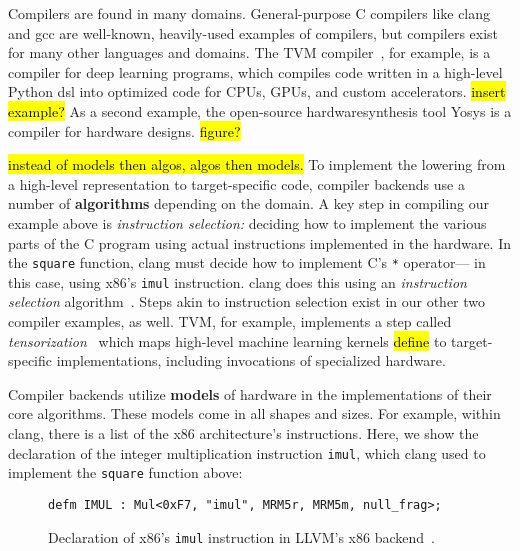 Compilers are found in many domains.
General-purpose C compilers like
  clang and gcc
  are well-known, heavily-used examples
  of compilers,
  but compilers exist for many other languages
  and domains.
The TVM compiler~\cite{tvm,chen2018tvm},
  for example,
  is a compiler for deep learning
  programs,
  which compiles code written in a
  high-level
  Python
  \gls{dsl}
  into optimized code
  for CPUs, GPUs,
  and custom accelerators.
\hl{ insert example?}
As a second example,
  the open-source \gls{hardwaresynthesis}
  tool Yosys
  is a compiler for hardware designs.
\hl{figure?}

\hl{instead of models then algos, algos then models.}
To implement the lowering
  from a high-level representation
  to target-specific code,
  compiler backends use a number of
  \textbf{algorithms}
  depending on the domain.
A key step in 
  compiling our
  example above
  is
  \textit{instruction selection:}
  deciding how to implement
  the various parts of the C program
  using actual instructions
  implemented in the hardware.
In the \texttt{square} function,
  clang must decide how to implement
  C's \texttt{*} operator---%
  in this case, using x86's
  \texttt{imul} instruction.
clang does this using
  an \textit{instruction selection}
  algorithm~\cite{llvminstructionselection}.
Steps akin to instruction selection
  exist in our other two compiler examples,
  as well.
TVM, for example, implements a step
  called 
  \textit{tensorization}~\cite{tvmtensorization}
  which maps high-level 
  machine learning kernels \hl{define}
  to target-specific implementations,
  including invocations
  of specialized hardware.

Compiler backends 
  utilize \textbf{models} of hardware
  in the implementations 
  of their core algorithms.
These models come in all shapes
  and sizes.
For example,
  within clang, there is a list
  of the x86 architecture's
  instructions.
Here,
  we show the declaration of
  the integer multiplication
  instruction
  \texttt{imul},
  which clang used to implement
  the \texttt{square} function above:
  
\begin{figure}[H]
    \centering
\begin{verbatim}
defm IMUL : Mul<0xF7, "imul", MRM5r, MRM5m, null_frag>;
\end{verbatim}
\caption{
Declaration of x86's
  \texttt{imul}
  instruction in LLVM's x86 
  backend~\cite{llvmx86tablegen}.
}
    \label{fig:intro:llvm-tablegen}
\end{figure}

